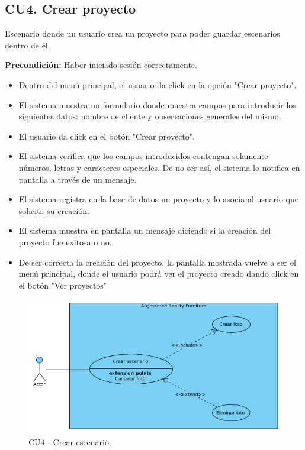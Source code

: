 \subsection{CU4. Crear proyecto}\par
Escenario donde un usuario crea un proyecto para poder guardar escenarios dentro de él.\par
\textbf{Precondición:} Haber iniciado sesión correctamente.\par
\begin{itemize}
	\item Dentro del menú principal, el usuario da click en la opción "Crear proyecto".
	\item El sistema muestra un formulario donde muestra campos para introducir los siguientes datos: nombre de cliente y observaciones generales del mismo.
	\item El usuario da click en el botón "Crear proyecto".
	\item El sistema verifica que los campos introducidos contengan solamente números, letras y caracteres especiales. De no ser así, el sistema lo notifica en pantalla a través de un mensaje.
	\item El sistema registra en la base de datos un proyecto y lo asocia al usuario que solicita su creación.
	\item El sistema muestra en pantalla un mensaje diciendo si la creación del proyecto fue exitosa o no.
	\item De ser correcta la creación del proyecto, la pantalla mostrada vuelve a ser el menú principal, donde el usuario podrá ver el proyecto creado dando click en el botón "Ver proyectos"
\end{itemize}
\begin{figure}[h!]
	\centering
	\includegraphics[width=12cm,height=6cm]{imagenes/analisis/crearEscenario.jpg}
	\caption{CU4 - Crear escenario.}
	\label{fig:analogo}
\end{figure}


